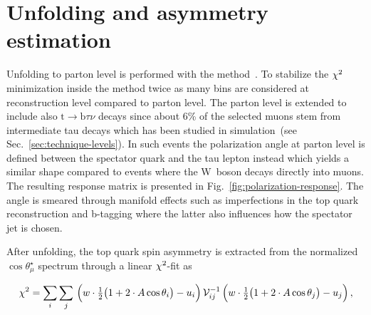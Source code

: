 

\section{Unfolding and asymmetry estimation}
\label{sec:polarization-unfolding}

Unfolding to parton level is performed with the \TUNFOLD method~\cite{1748-0221-7-10-T10003}. To stabilize the $\chi^\scriptn{2}$ minimization inside the method twice as many bins are considered at reconstruction level compared to parton level. The parton level is extended to include also $\mathrm{t}\to\mathrm{b}\tau\nu$ decays since about 6\% of the selected muons stem from intermediate tau decays which has been studied in simulation~(see Sec.~\ref{sec:technique-levels}). In such events the polarization angle at parton level is defined between the spectator quark and the tau lepton instead which yields a similar shape compared to events where the W~boson decays directly into muons. The resulting response matrix is presented in Fig.~\ref{fig:polarization-response}. The angle is smeared through manifold effects such as imperfections in the top quark reconstruction and b-tagging where the latter also influences how the spectator jet is chosen. 
 

After unfolding, the top quark spin asymmetry is extracted from the normalized $\cos\theta_\mu^\star$ spectrum through a linear $\chi^\scriptn{2}$-fit as

\begin{equation}
\chi^\scriptn{2}=\sum_{i}\sum_{j}\,\Big(w\cdot\tfrac{1}{2}\big(1+2\cdot A \cos\theta_{i}\big)-u_{i}\Big)\,\mathcal{V}_{ij}^{-1}\,\Big(w\cdot\tfrac{1}{2}\big(1+2\cdot A \cos\theta_{j}\big)-u_{j}\Big)\,,
\end{equation}

